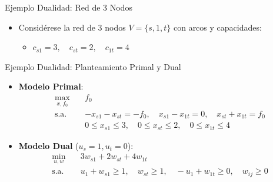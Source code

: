 \documentclass[
  ignorenonframetext,
]{beamer}
\providecommand{\tightlist}{%
  \setlength{\itemsep}{0pt}\setlength{\parskip}{0pt}}
\begin{document}
\begin{frame}{Ejemplo Dualidad: Red de 3 Nodos}
\label{ejemplo-dualidad-red-de-3-nodos}
\begin{itemize}
\tightlist
\item
  Considérese la red de 3 nodos \(V = \{s, 1, t\}\) con arcos y
  capacidades:

  \begin{itemize}
  \tightlist
  \item
    \(c_{s1} = 3, \quad c_{st} = 2, \quad c_{1t} = 4\)
  \end{itemize}
\end{itemize}
\end{frame}

\begin{frame}{Ejemplo Dualidad: Planteamiento Primal y Dual}
\label{ejemplo-dualidad-planteamiento-primal-y-dual}
\begin{itemize}
\item
  \textbf{Modelo Primal}:
  \[\begin{aligned} \max_{x, f_0} \quad & f_0 \\ \text{s.a.} \quad & -x_{s1} - x_{st} = -f_0, \quad x_{s1} - x_{1t} = 0, \quad x_{st} + x_{1t} = f_0 \\ & 0 \le x_{s1} \le 3, \quad 0 \le x_{st} \le 2, \quad 0 \le x_{1t} \le 4 \end{aligned}\]
\item
  \textbf{Modelo Dual} (\(u_s = 1, u_t = 0\)):
  \[\begin{aligned} \min_{u, w} \quad & 3 w_{s1} + 2 w_{st} + 4 w_{1t} \\ \text{s.a.} \quad & u_1 + w_{s1} \ge 1, \quad w_{st} \ge 1, \quad -u_1 + w_{1t} \ge 0, \quad w_{ij} \ge 0 \end{aligned}\]
\end{itemize}
\end{frame}
\end{document}
